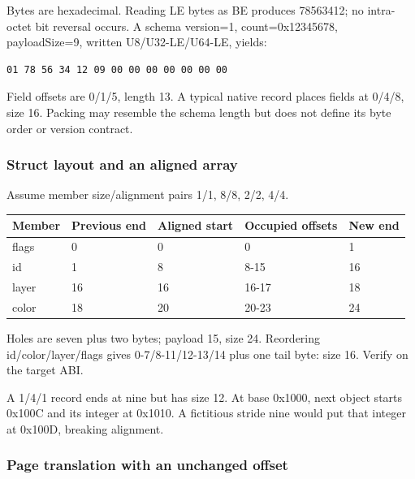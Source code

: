 Bytes are hexadecimal. Reading LE bytes as BE produces 78563412; no intra-octet bit reversal occurs. A schema version=1, count=0x12345678, payloadSize=9, written U8/U32-LE/U64-LE, yields:

\begin{verbatim}
01 78 56 34 12 09 00 00 00 00 00 00 00
\end{verbatim}

Field offsets are 0/1/5, length 13. A typical native record places fields at 0/4/8, size 16. Packing may resemble the schema length but does not define its byte order or version contract.

\subsubsection{Struct layout and an aligned array}\label{appendix-92ff77d4dfdc-struct-layout-and-an-aligned-array}

\hypertarget{appendix-92ff77d4dfdc-struct-layout-and-an-aligned-array}{}

Assume member size/alignment pairs 1/1, 8/8, 2/2, 4/4.

{\def\LTcaptype{none} %
\begin{longtable}[]{@{}lllll@{}}
\toprule\noalign{}
Member & Previous end & Aligned start & Occupied offsets & New end \\
\midrule\noalign{}
\endhead
\bottomrule\noalign{}
\endlastfoot
flags & 0 & 0 & 0 & 1 \\
id & 1 & 8 & 8-15 & 16 \\
layer & 16 & 16 & 16-17 & 18 \\
color & 18 & 20 & 20-23 & 24 \\
\end{longtable}
}

Holes are seven plus two bytes; payload 15, size 24. Reordering id/color/layer/flags gives 0-7/8-11/12-13/14 plus one tail byte: size 16. Verify on the target ABI.

A 1/4/1 record ends at nine but has size 12. At base 0x1000, next object starts 0x100C and its integer at 0x1010. A fictitious stride nine would put that integer at 0x100D, breaking alignment.

\subsubsection{Page translation with an unchanged offset}\label{appendix-92ff77d4dfdc-page-translation-with-an-unchanged-offset}

